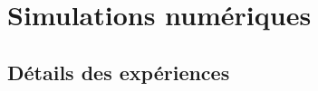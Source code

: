 \documentclass[11pt,french,ignorenonframetext,]{beamer}
\begin{document}
\section{\hfill{}Simulations numériques\hfill{}}









\subsection{\hfill{}Détails des expériences\hfill{}}
\end{document}
